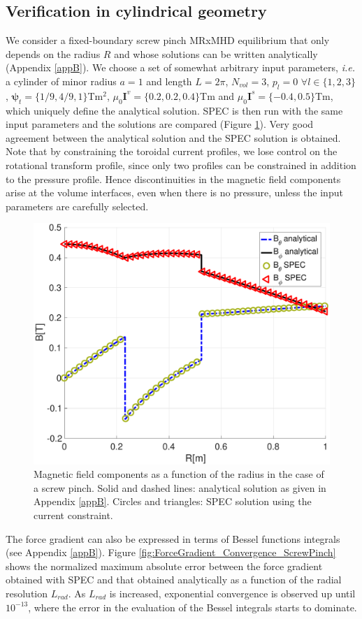  \subsection{Verification in cylindrical geometry}
 
 We consider a fixed-boundary screw pinch \ac{MRxMHD} equilibrium that only depends on the radius $R$ and whose solutions can be written analytically (Appendix \ref{appB}). We choose a set of somewhat arbitrary input parameters, \textit{i.e.} a cylinder of minor radius $a=1$ and length $L=2\pi$, $N_{vol}=3$, $p_l=0$ $\forall l\in\{1,2,3\}$, $\bm{\psi}_t = \{1/9, 4/9, 1\}$Tm${}^2$, $\mu_0\mathbf{I}^v=\{0.2,0.2,0.4\}$Tm and $\mu_0\mathbf{I}^s=\{-0.4,0.5\}$Tm, which uniquely define the analytical solution. \ac{SPEC} is then run with the same input parameters and the solutions are compared (Figure \ref{fig:SP_constraint_verification}). Very good agreement between the analytical solution and the \ac{SPEC} solution is obtained. Note that by constraining the toroidal current profiles, we lose control on the rotational transform profile, since only two profiles can be constrained in addition to the pressure profile. Hence discontinuities in the magnetic field components arise at the volume interfaces, even when there is no pressure, unless the input parameters are carefully selected.
 
 \begin{figure}
     \centering
     \includegraphics[width=0.5\linewidth]{main/Figures_CurrentConstraint/ABaillod_fig6.pdf}
     \caption{Magnetic field components as a function of the radius in the case of a screw pinch. Solid and dashed lines: analytical solution as given in Appendix \ref{appB}. Circles and triangles: \ac{SPEC} solution using the current constraint.}
     \label{fig:SP_constraint_verification}
 \end{figure}
 The force gradient can also be expressed in terms of Bessel functions integrals (see Appendix \ref{appB}). Figure \ref{fig:ForceGradient_Convergence_ScrewPinch} shows the normalized maximum absolute error between the force gradient obtained with \ac{SPEC} and that obtained analytically as a function of the radial resolution $L_{rad}$. As $L_{rad}$ is increased, exponential convergence is observed up until $10^{-13}$, where the error in the evaluation of the Bessel integrals starts to dominate. 
 
